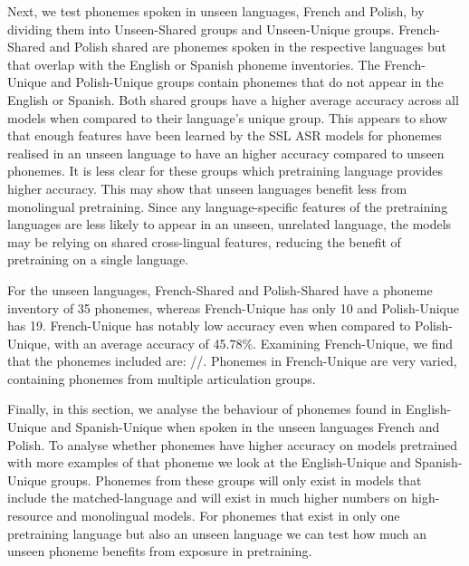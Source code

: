 Next, we test phonemes spoken in unseen languages, French and Polish, by dividing them into Unseen-Shared groups and Unseen-Unique groups. French-Shared and Polish shared are phonemes spoken in the respective languages but that overlap with the English or Spanish phoneme inventories. The French-Unique and Polish-Unique groups contain phonemes that do not appear in the English or Spanish. Both shared groups have a higher average accuracy across all models when compared to their language's unique group. This appears to show that enough features have been learned by the SSL ASR models for phonemes realised in an unseen language to have an higher accuracy compared to unseen phonemes. It is less clear for these groups which pretraining language provides higher accuracy. This may show that unseen languages benefit less from monolingual pretraining. Since any language-specific features of the pretraining languages are less likely to appear in an unseen, unrelated language, the models may be relying on shared cross-lingual features, reducing the benefit of pretraining on a single language. \cite{li2023quantitative, XLSR-53}  

For the unseen languages, French-Shared and Polish-Shared have a phoneme inventory of 35 phonemes, whereas French-Unique has only 10 and Polish-Unique has 19. French-Unique has notably low accuracy even when compared to Polish-Unique, with an average accuracy of 45.78\%. Examining French-Unique, we find that the phonemes included are: //. Phonemes in French-Unique are very varied, containing phonemes from multiple articulation groups. 

Finally, in this section, we analyse the behaviour of phonemes found in English-Unique and Spanish-Unique when spoken in the unseen languages French and Polish. To analyse whether phonemes have higher accuracy on models pretrained with more examples of that phoneme we look at the English-Unique and Spanish-Unique groups. Phonemes from these groups will only exist in models that include the matched-language and will exist in much higher numbers on high-resource and monolingual models. For phonemes that exist in only one pretraining language but also an unseen language we can test how much an unseen phoneme benefits from exposure in pretraining. 

